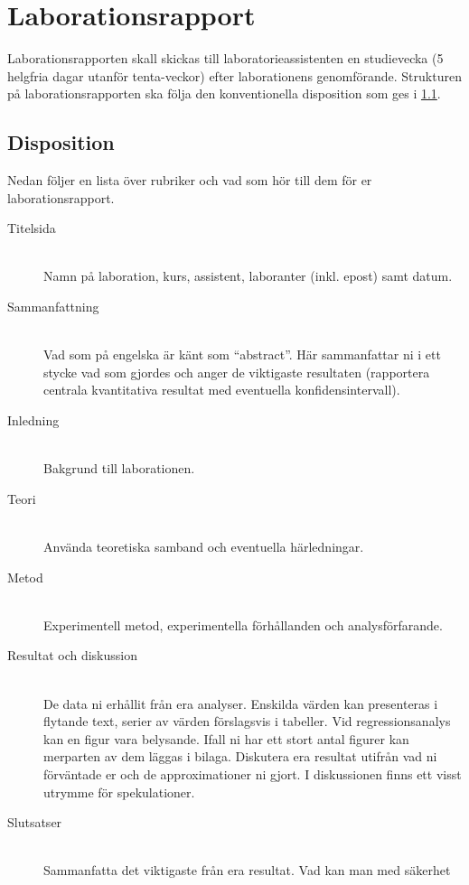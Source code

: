 \section{Laborationsrapport}
\label{sec:rapport}
Laborationsrapporten skall skickas till laboratorieassistenten en
studievecka (5 helgfria dagar utanför tenta-veckor) efter laborationens genomförande. Strukturen på
laborationsrapporten ska följa den konventionella disposition som ges i 
\cref{sec:rapport-disposition}.

\subsection{Disposition}
\label{sec:rapport-disposition}
Nedan följer en lista över rubriker och vad som hör till dem för er
laborationsrapport. 
\begin{description}
  \item[Titelsida] \hfill \\
    Namn på laboration, kurs, assistent, laboranter (inkl. epost) samt datum.
  \item[Sammanfattning] \hfill \\
    Vad som på engelska är känt som ``abstract''. Här sammanfattar ni i
    ett stycke vad som gjordes och anger de viktigaste resultaten
    (rapportera centrala kvantitativa resultat med eventuella
    konfidensintervall).
  \item[Inledning] \hfill \\ 
    Bakgrund till laborationen.
  \item[Teori] \hfill \\ 
    Använda teoretiska samband och eventuella härledningar.
  \item[Metod] \hfill \\ 
    Experimentell metod, experimentella förhållanden och analysförfarande.
  \item[Resultat och diskussion] \hfill \\ 
    De data ni erhållit från era analyser. Enskilda värden kan
    presenteras i flytande text, serier av värden förslagsvis i tabeller.
    Vid regressionsanalys kan en figur vara belysande. Ifall ni har
    ett stort antal figurer kan merparten av dem läggas i
    bilaga. Diskutera era resultat utifrån vad ni förväntade er och de
    approximationer ni gjort. I diskussionen finns ett visst utrymme för
    spekulationer.
  \item[Slutsatser] \hfill \\ 
    Sammanfatta det viktigaste från era resultat. Vad kan man med säkerhet

\end{description}
